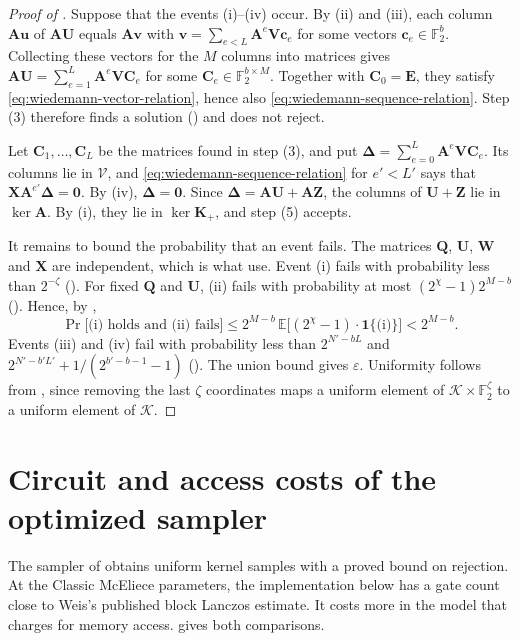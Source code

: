 \documentclass[b5paper, 10pt, abstract=true, captions=tableheading]{scrartcl}
\theoremstyle{plain}
\theoremstyle{definition}
\newcommand{\FF}{\mathds{F}}
\renewcommand{\vec}[1]{\symbf{#1}}
\newcommand{\mat}[1]{\symbf{#1}}
\newcommand{\calK}{\mathcal{K}}
\begin{document}
\begin{proof}[Proof of ]
Suppose that the events (i)--(iv) occur. By (ii) and (iii), each column
$\mat A\vec u$ of $\mat A\mat U$ equals $\mat A\vec v$ with
$\vec v=\sum_{e<L}\mat A^e\mat V\vec c_e$ for some vectors
$\vec c_e\in\FF_2^b$. Collecting these vectors for the $M$ columns into
matrices gives $\mat A\mat U=\sum_{e=1}^{L}\mat A^e\mat V\mat C_e$ for some
$\mat C_e\in\FF_2^{b\times M}$. Together with $\mat C_0=\mat E$, they
satisfy \eqref{eq:wiedemann-vector-relation}, hence also
\eqref{eq:wiedemann-sequence-relation}. Step (3) therefore finds a
solution () and does not reject.

Let $\mat C_1,\ldots,\mat C_L$ be the matrices found in step (3), and put
$\mat\Delta=\sum_{e=0}^{L}\mat A^e\mat V\mat C_e$. Its columns lie in
$\mathcal V$, and \eqref{eq:wiedemann-sequence-relation} for $e'<L'$ says
that $\mat X\mat A^{e'}\mat\Delta=\mat 0$. By (iv), $\mat\Delta=\mat 0$.
Since $\mat\Delta=\mat A\mat U+\mat A\mat Z$, the columns of $\mat U+\mat Z$ lie in
$\ker\mat A$. By (i), they lie in $\ker\mat K_+$, and step (5) accepts.

It remains to bound the probability that an event fails. The matrices
$\mat Q$, $\mat U$, $\mat W$ and $\mat X$ are independent, which is what
use. Event (i) fails with probability less than $2^{-\zeta}$
(). For fixed $\mat Q$ and $\mat U$, (ii)
fails with probability at most $(2^\chi-1)2^{M-b}$
(). Hence, by
,
\[
  \Pr\bigl[\text{(i) holds and (ii) fails}\bigr]
  \leq2^{M-b}\,\mathbb E\bigl[(2^\chi-1)\cdot\mathbf 1\{\text{(i)}\}\bigr]
  <2^{M-b}.
\]
Events (iii) and (iv) fail with probability less than
$2^{N'-bL}$ and $2^{N'-b'L'}+1/(2^{b'-b-1}-1)$
(). The union bound gives
$\varepsilon$. Uniformity follows from , since
removing the last $\zeta$ coordinates maps a uniform element of
$\calK\times\FF_2^\zeta$ to a uniform element of $\calK$.
\end{proof}


\section{Circuit and access costs of the optimized sampler}
\label{app:wiedemann-cost}
The sampler of  obtains uniform kernel samples with
a proved bound on rejection. At the Classic McEliece parameters, the
implementation below has a gate count close to Weis's published block
Lanczos estimate. It costs more in the model that charges for memory
access.  gives both comparisons.
\end{document}
